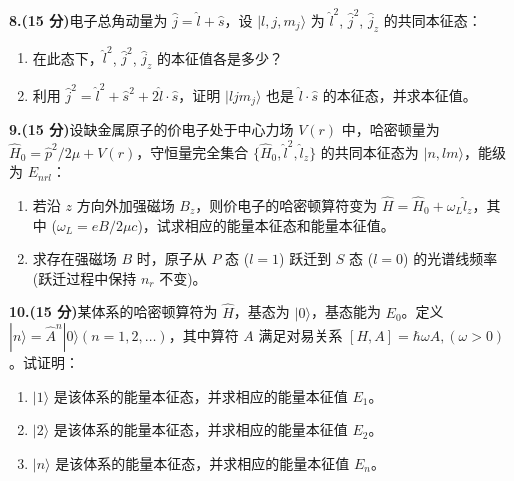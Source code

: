 \textbf{8.(15 分)}电子总角动量为 $\hat{j} = \hat{l} + \hat{s}$，设 $|l, j, m_j \rangle$ 为 $\hat{l}^2$, $\hat{j}^2$, $\hat{j}_z$ 的共同本征态：

\begin{enumerate}
    \item 在此态下，$\hat{l}^2$, $\hat{j}^2$, $\hat{j}_z$ 的本征值各是多少？
    \item 利用 $\hat{j}^2 = \hat{l}^2 + \hat{s}^2 + 2\hat{l} \cdot \hat{s}$，证明 $|l j m_j\rangle$ 也是 $\hat{l} \cdot \hat{s}$ 的本征态，并求本征值。
\end{enumerate}

\textbf{9.(15 分)}设缺金属原子的价电子处于中心力场 $V(r)$ 中，哈密顿量为 $\hat{H}_0 = \hat{p}^2/2\mu + V(r)$，守恒量完全集合 $\{\hat{H}_0, \hat{l}^2, \hat{l}_z \}$ 的共同本征态为 $|n,l m\rangle$，能级为 $E_{nrl}$：

\begin{enumerate}
    \item  若沿 $z$ 方向外加强磁场 $B_z$，则价电子的哈密顿算符变为 $\hat{H} = \hat{H}_0 + \omega_L \hat{l}_z$，其中 ($\omega_L = eB/2\mu c$)，试求相应的能量本征态和能量本征值。
    \item  求存在强磁场 $B$ 时，原子从 $P$ 态 ($l = 1$) 跃迁到 $S$ 态 ($l = 0$) 的光谱线频率 (跃迁过程中保持 $n_r$ 不变)。
\end{enumerate}

\textbf{10.(15 分)}某体系的哈密顿算符为 $\hat{H}$，基态为 $|0\rangle$，基态能为 $E_0$。定义 $|n\rangle = \hat{A}^n |0\rangle (n = 1, 2, \dots)$，其中算符 $A$ 满足对易关系 $[H, A] = \hbar \omega A, (\omega > 0)$。试证明：

\begin{enumerate}
    \item  $|1\rangle$ 是该体系的能量本征态，并求相应的能量本征值 $E_1$。
    \item  $|2\rangle$ 是该体系的能量本征态，并求相应的能量本征值 $E_2$。
    \item  $|n\rangle$ 是该体系的能量本征态，并求相应的能量本征值 $E_n$。
\end{enumerate}